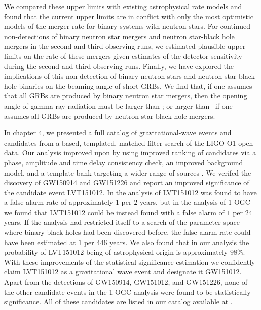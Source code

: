 We compared these upper limits with existing astrophysical rate models and found that the
current upper limits are in conflict with only the most optimistic models of the merger
rate for binary systems with neutron stars. For continued non-detections of
binary neutron star mergers and neutron star-black hole mergers in the second and
third observing runs,
we estimated plausible upper limits on the rate of these mergers given estimates of the detector
sensitivity during the second and third observing runs.
Finally, we have explored the implications of this non-detection of binary neutron stars and
neutron star-black hole binaries on
the beaming angle of short \acp{GRB}. We find that, if one assumes that all \acp{GRB}
are produced by binary neutron star mergers, then the opening angle of gamma-ray radiation must be larger
than \GRBBNSBeamingAngleConstraint; or larger than \GRBNSBHFiveBeamingAngleConstraint\ if
one assumes all \acp{GRB} are produced by neutron star-black hole mergers.


In chapter $4$, we presented a full catalog of gravitational-wave events and candidates from a \pycbc{}\-based, templated, matched-filter search of the LIGO O1 open data. Our analysis improved upon \cite{TheLIGOScientific:2016pea,Abbott:2016ymx} by using improved ranking of candidates via a phase, amplitude and time delay consistency check, an improved background model, and a template bank targeting a wider range of sources \citep{Nitz:2017svb, Nitz:2017lco,DalCanton:2017ala}. We verifed the discovery of GW150914 and GW151226 and report an improved significance of the candidate event LVT151012. In the analysis of \cite{TheLIGOScientific:2016pea,Abbott:2016ymx} LVT151012 was found to have a false alarm rate of approximately $1$ per $2$ years, but in the analysis of 1-OGC we found that LVT151012 could be instead found with a false alarm of $1$ per $24$ years. If the analysis had restricted itself to a search of the parameter space where binary black holes had been discovered before, the false alarm rate could have been estimated at $1$ per $446$ years. We also found that in our analysis the probability of LVT151012 being of astrophysical origin is approximately $98 \%$. With these improvements of the statistical significance estimation we confidently claim LVT151012 as a gravitational wave event and designate it GW151012. Apart from the detections of GW150914, GW151012, and GW151226, none of the other candidate events in the 1-OGC analysis were found to be statistically significance. All of these candidates are listed in our catalog available at \release{}.


